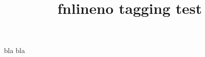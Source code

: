 \documentclass{article}
\title{fnlineno tagging test}
\begin{document}
\begin{linenumbers}
bla bla
\end{linenumbers}
\end{document}

